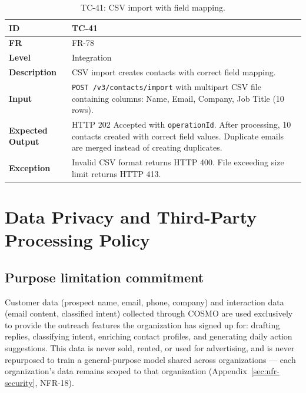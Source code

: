 \documentclass[a4paper]{article}
\begin{document}
\begin{table}[H]
\centering
\caption{TC-41: CSV import with field mapping.}
\small
\begin{tabular}{|p{3cm}|p{10.5cm}|}
\hline
\textbf{ID} & TC-41 \\
\hline
\textbf{FR} & FR-78 \\
\hline
\textbf{Level} & Integration \\
\hline
\textbf{Description} & CSV import creates contacts with correct field mapping. \\
\hline
\textbf{Input} & \texttt{POST /v3/contacts/import} with multipart CSV file containing columns: Name, Email, Company, Job Title (10 rows). \\
\hline
\textbf{Expected Output} & HTTP 202 Accepted with \texttt{operationId}. After processing, 10 contacts created with correct field values. Duplicate emails are merged instead of creating duplicates. \\
\hline
\textbf{Exception} & Invalid CSV format returns HTTP 400. File exceeding size limit returns HTTP 413. \\
\hline
\end{tabular}
\end{table}


\newpage
\section{Data Privacy and Third-Party Processing Policy}
\label{appendix:privacy}

\subsection{Purpose limitation commitment}
Customer data (prospect name, email, phone, company) and interaction
data (email content, classified intent) collected through COSMO are
used exclusively to provide the outreach features the organization has
signed up for: drafting replies, classifying intent, enriching contact
profiles, and generating daily action suggestions. This data is never
sold, rented, or used for advertising, and is never repurposed to
train a general-purpose model shared across organizations --- each
organization's data remains scoped to that organization
(Appendix~\ref{sec:nfr-security}, NFR-18).
\end{document}
